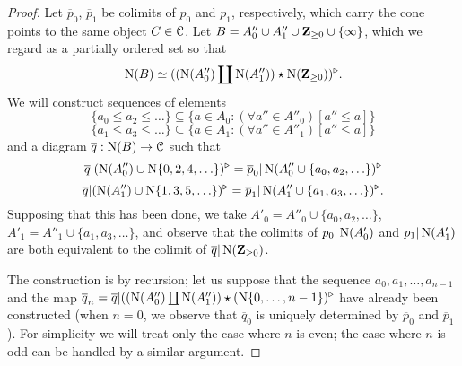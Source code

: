 \begin{proof}
Let $\overline{p}_0$, $\overline{p}_1$ be colimits of $p_0$ and $p_1$, respectively, which carry the cone points to the same object $C \in \operatorname{\mathcal{C}}$. Let
$B = A''_0 \cup A''_1 \cup \mathbf{Z}_{\geq 0} \cup \{ \infty\}$, which we regard as a partially ordered set so that $$\operatorname{N}(B) \simeq (( \operatorname{N}(A''_0) \coprod \operatorname{N} (A''_1)) \star \operatorname{N}(\mathbf{Z}_{\geq 0}))^{\triangleright}.$$
We will construct sequences of elements
$$ \{ a_0 \leq a_2 \leq \ldots \} \subseteq \{ a \in A_0: (\forall a'' \in A''_0) [a'' \leq a] \}$$
$$ \{ a_1 \leq a_3 \leq \ldots \} \subseteq \{ a \in A_1: (\forall a'' \in A''_1) [a'' \leq a] \}$$
and a diagram $\overline{q}: \operatorname{N}(B) \rightarrow \operatorname{\mathcal{C}}$ such that
$$ \overline{q} | (\operatorname{N}(A''_0) \cup \operatorname{N} \{ 0,2,4, \ldots \})^{\triangleright} = \overline{p}_0 | \operatorname{N} ( A''_0 \cup \{ a_0, a_2, \ldots \})^{\triangleright}$$
$$ \overline{q} | (\operatorname{N}(A''_1) \cup \operatorname{N} \{ 1,3,5, \ldots \})^{\triangleright} = \overline{p}_1 | \operatorname{N} ( A''_1 \cup \{ a_1, a_3, \ldots \})^{\triangleright}.$$
Supposing that this has been done, we take $A'_0 = A''_0 \cup \{ a_0, a_2, \ldots \}$,
$A'_1 = A''_1 \cup \{a_1, a_3, \ldots \}$, and observe that the colimits of $p_0 | \operatorname{N}(A'_0)$ 
and $p_1 | \operatorname{N}(A'_1)$ are both equivalent to the colimit of $\overline{q} | \operatorname{N}(\mathbf{Z}_{\geq 0})$.

The construction is by recursion; let us suppose that the sequence 
$a_0, a_1, \ldots, a_{n-1}$ and the map $\overline{q}_{n} = \overline{q}| ((\operatorname{N}(A''_0) \coprod \operatorname{N}(A''_1)) \star (\operatorname{N}\{0, \ldots, n-1\})^{\triangleright}$ have already been constructed (when $n=0$, we observe that $\overline{q}_{0}$ is uniquely determined by $\overline{p}_0$ and $\overline{p}_1$). For simplicity we will treat only the case where $n$ is even; the case where $n$ is odd can be handled by a similar argument.


\end{proof}
